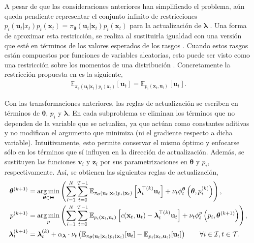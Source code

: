 A pesar de que las consideraciones anteriores han simplificado el problema, aún queda pendiente representar el conjunto infinito de restricciones $p_i(\mathbf{u}_t|x_t)p_i(\mathbf{x}_t)=\pi_{\bm\theta}(\mathbf{u}_t|\mathbf{x}_t)p_i(\mathbf{x}_t)$ para la actualización de $\bm\lambda$ \cite{Deep_Visuomotor_Policies}. Una forma de aproximar esta restricción, se realiza al sustituirla igualdad  con una versión que esté en términos de los valores esperados de los rasgos \cite{peters2010}. Cuando estos rasgos están compuestos por funciones de variables aleatorias, esto puede ser visto como una restricción sobre los momentos de una distribución \cite{Deep_Visuomotor_Policies}. Concretamente la restricción propuesta en \cite{Deep_Visuomotor_Policies} es la siguiente, 
\begin{align}
    \mathbb{E}_{\pi_{\bm\theta}(\mathbf{u}_t|\mathbf{x}_t) p_i(\mathbf{x}_t)}[\mathbf{u}_t] = \mathbb{E}_{p_i(\mathbf{x}_t, \mathbf{u}_t)}[\mathbf{u}_t].
\end{align}

Con las transformaciones anteriores, las reglas de actualización se escriben en términos de $\bm\theta$, $p_i$ y $\bm\lambda$. En cada subproblema se eliminan los términos que no dependen de la variable que se actualiza, ya que actúan como constantes aditivas y no modifican el argumento que minimiza (ni el gradiente respecto a dicha variable). Intuitivamente, esto permite conservar el mismo óptimo y enfocarse sólo en los términos que sí influyen en la dirección de actualización. Además, se sustituyen las funciones $\mathbf{v}_i$ y $\mathbf{z}_i$ por sus parametrizaciones en $\bm\theta$ y $p_i$, respectivamente. Así, se obtienen las siguientes reglas de actualización,
\begin{align}
    \bm\theta^{(k+1)} &= \operatorname*{arg\,min}_{\bm\theta \in \Theta} \left(\sum_{i=1}^{N}\sum_{t=0}^{T-1}\mathbb{E}_{\pi_{\bm\theta}(\mathbf{u}_t|\mathbf{x}_t)p_i(\mathbf{x}_t)} \left[\bm\lambda_{t}^{\top(k)}\mathbf{u}_t\right] + \nu_t\phi_{t}^{\bm\theta}\left(\bm\theta, p_i^{(k)}\right)\right) \label{eq:GPS_theta},\\
    p^{(k+1)} &= \operatorname*{arg\,min}_{p}\left(\sum_{i=1}^{N}\sum_{t=0}^{T-1} \mathbb{E}_{p_i(\mathbf{x}_t, \mathbf{u}_t)}\left[c(\mathbf{x}_t, \mathbf{u}_t) - \bm\lambda_t^{\top(k)}\mathbf{u}_t\right] + \nu_t \phi_t^{p}\left(p_i, \bm\theta^{(k+1)}\right)\right) 
    \label{eq:GPS_p},\\
    \bm{\lambda}_t^{(k+1)} &= \bm{\lambda}_t^{(k)} + \alpha_{\bm\lambda} \cdot \nu_t \left(\mathbb{E}_{\pi_{\bm\theta}(\mathbf{u}_t|\mathbf{x}_t) p_i(\mathbf{x}_t)}[\mathbf{u}_t] - \mathbb{E}_{p_i(\mathbf{x}_t, \mathbf{u}_t)}[\mathbf{u}_t]\right) \qquad \forall i \in \mathcal{I}, t \in \mathcal{T}. 
    \label{eq:GPS_lambda}
\end{align}

